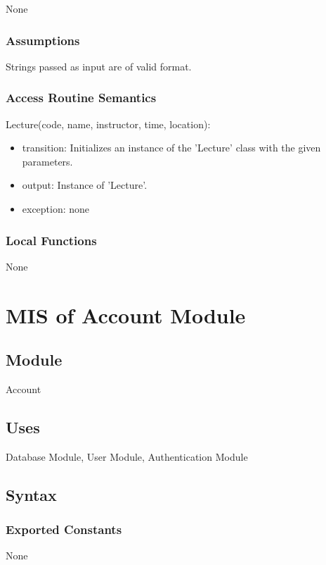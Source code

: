 \documentclass[12pt, titlepage]{article}
\begin{document}
None

\subsubsection{Assumptions}

Strings passed as input are of valid format.

\subsubsection{Access Routine Semantics}

\noindent Lecture(code, name, instructor, time, location):
\begin{itemize}
\item transition: Initializes an instance of the 'Lecture' class with the given parameters.
\item output: Instance of 'Lecture'.
\item exception: none
\end{itemize}

\subsubsection{Local Functions}

None

\newpage

\section{MIS of Account Module} \label{mAccount}

\subsection{Module}

Account

\subsection{Uses}

Database Module, User Module, Authentication Module

\subsection{Syntax}

\subsubsection{Exported Constants}
None
\end{document}
